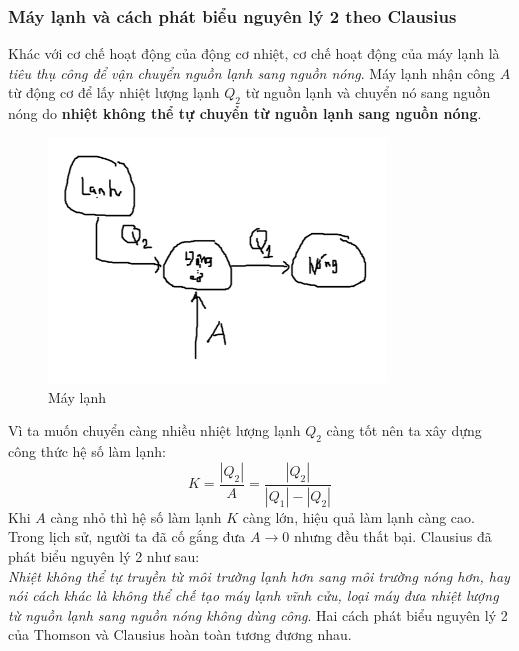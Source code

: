 \subsubsection{Máy lạnh và cách phát biểu nguyên lý 2 theo Clausius}
Khác với cơ chế hoạt động của động cơ nhiệt, cơ chế hoạt động của máy lạnh là \textit{tiêu thụ công để vận chuyển nguồn lạnh sang nguồn nóng}.
Máy lạnh nhận công $A$ từ động cơ để lấy nhiệt lượng lạnh $Q_{2}$ từ nguồn lạnh và chuyển nó sang nguồn nóng do \textbf{nhiệt không thể tự chuyển từ nguồn lạnh sang nguồn nóng}.
\begin{figure}
    \centering
    \includegraphics[width=0.8\textwidth]{maylanh.png}
    \caption{Máy lạnh}
    \label{maylanh}
\end{figure}
Vì ta muốn chuyển càng nhiều nhiệt lượng lạnh $Q_{2}$ càng tốt nên ta xây dựng công thức hệ số làm lạnh:
$$K=\frac{|Q_{2}|}{A}=\frac{|Q_{2}|}{|Q_{1}|-|Q_{2}|}$$
Khi $A$ càng nhỏ thì hệ số làm lạnh $K$ càng lớn, hiệu quả làm lạnh càng cao. Trong lịch sử, người ta đã cố gắng đưa $A\to 0$ nhưng đều thất bại. Clausius đã phát biểu nguyên lý 2 như sau:
\\ \textit{Nhiệt không thể tự truyền từ môi trường lạnh hơn sang môi trường nóng hơn, hay nói cách khác là không thể chế tạo máy lạnh vĩnh cửu, loại máy đưa nhiệt lượng từ nguồn lạnh sang nguồn nóng không dùng công}.
Hai cách phát biểu nguyên lý 2 của Thomson và Clausius hoàn toàn tương đương nhau.
